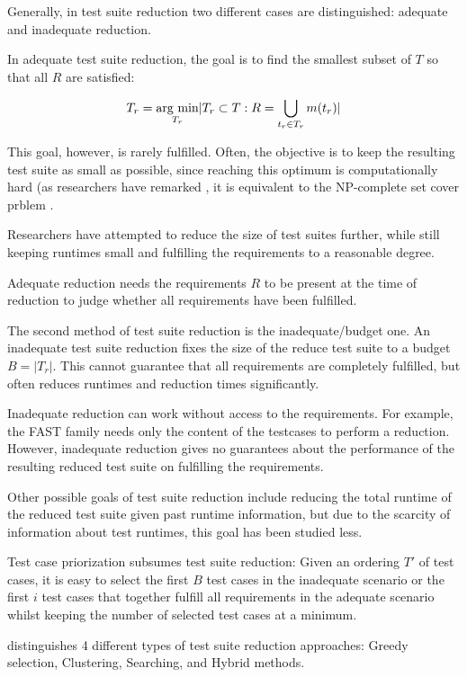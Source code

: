 
Generally, in test suite reduction two different cases are distinguished:
adequate and inadequate reduction.

In adequate test suite reduction, the goal is to find the smallest subset
of $T$ so that all $R$ are satisfied:

$$T_{r}=\underset{T_r}{\hbox{arg min}} |T_{r} \subset T: R=\bigcup_{t_{r} \in T_{r}} m(t_{r})|$$

This goal, however, is rarely fulfilled. Often, the objective is to
keep the resulting test suite as small as possible, since reaching
this optimum is computationally hard (as researchers have remarked
\cite{khan2016urvey}, it is equivalent to the NP-complete set cover
prblem \cite{garey1979computers}.

Researchers have attempted to reduce the size of test suites further,
while still keeping runtimes small and fulfilling the requirements to
a reasonable degree.

Adequate reduction needs the requirements $R$ to be present at the time
of reduction to judge whether all requirements have been fulfilled.

The second method of test suite reduction is the inadequate/budget
one. An inadequate test suite reduction fixes the size of the reduce
test suite to a budget $B=|T_{r}|$. This cannot guarantee that all
requirements are completely fulfilled, but often reduces runtimes and
reduction times significantly.

Inadequate reduction can work without access to the requirements.
For example, the FAST family needs only the content of the testcases to
perform a reduction. However, inadequate reduction gives no guarantees
about the performance of the resulting reduced test suite on fulfilling
the requirements.

Other possible goals of test suite reduction include reducing the total
runtime of the reduced test suite given past runtime information, but
due to the scarcity of information about test runtimes, this goal has
been studied less.

Test case priorization subsumes test suite reduction: Given an ordering
$T'$ of test cases, it is easy to select the first $B$ test cases in the
inadequate scenario or the first $i$ test cases that together fulfill
all requirements in the adequate scenario whilst keeping the number of
selected test cases at a minimum.

\cite{khan2018systematic} distinguishes 4 different types of test
suite reduction approaches: Greedy selection, Clustering, Searching,
and Hybrid methods.

